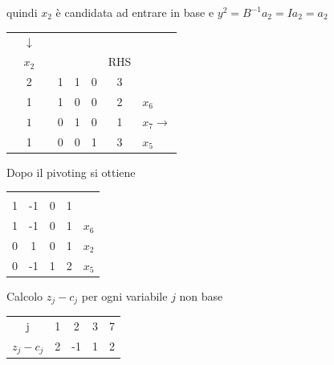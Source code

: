quindi $x_{2}$ è candidata ad entrare in base e $y^{2}=B^{-1}a_{2}=Ia_{2}=a_{2}$
\begin{table}[h]
	\centering
	\begin{tabular}{r|c|c|ccc|c|l}
		\multicolumn{1}{c}{} & \multicolumn{1}{c}{$\downarrow$} & \multicolumn{1}{c}{} &  &  & \multicolumn{1}{c}{} & \multicolumn{1}{c}{} & \\
		\multicolumn{1}{c}{} & \multicolumn{1}{c}{$x_{2}$} & \multicolumn{1}{c}{} &  &  & \multicolumn{1}{c}{} & \multicolumn{1}{c}{RHS} & \\ \cline{2-2} \cline{4-7}
		& 2 &  & 1 & 1 & 0 & 3 &  \\ \cline{2-2} \cline{4-7}
		& 1 &  & 1 & 0 & 0 & 2 & $x_{6}$ \\
		& {\LARGE \textcircled{\normalsize $1$}} &  & 0 & 1 & 0 & 1 & $x_{7}\rightarrow$ \\
		& 1 &  & 0 & 0 & 1 & 3 & $x_{5}$ \\
		\cline{2-2} \cline{4-7}
	\end{tabular}
\end{table}

Dopo il pivoting si ottiene
\begin{table}[!h]
	\centering
	\begin{tabular}{|ccc|c|c}
		\multicolumn{1}{c}{} & & \multicolumn{1}{c}{} & \multicolumn{1}{c}{} & \\ \cline{1-4}
		1 & -1 & 0 & 1 & \\ \cline{1-4}
		1 & -1 & 0 & 1 & $x_{6}$ \\
		0 & 1 & 0 & 1 & $x_{2}$ \\
		0 & -1 & 1 & 2 & $x_{5}$ \\ \cline{1-4}
	\end{tabular}
\end{table}

Calcolo $z_{j}-c_{j}$ per ogni variabile $j$ non base
\begin{table}[!h]
	\centering
	\begin{tabular}{c|cccc}
		j & 1 & 2 & 3 & 7 \\ \cline{2-5}
		$z_{j}-c_{j}$ & 2 & -1 & 1 & 2
	\end{tabular}
\end{table}


